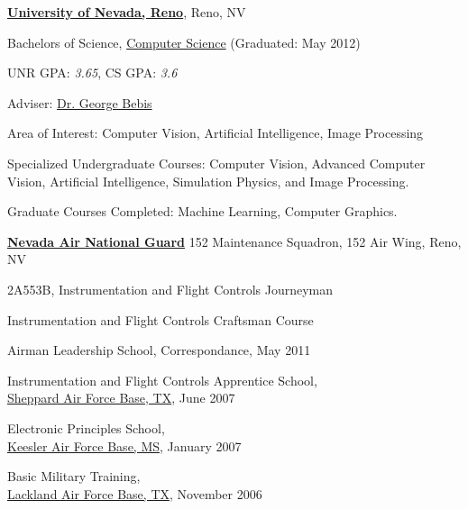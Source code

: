 \documentclass[10pt]{article}
\newenvironment{outerlist}[1][\enskip\textbullet]%
        {\begin{itemize}[#1]}{\end{itemize}%
         \vspace{-.6\baselineskip}}
\newenvironment{innerlist}[1][\enskip\textbullet]%
        {\begin{compactitem}[#1]}{\end{compactitem}}
\begin{document}
\href{http://www.unr.edu/}{\textbf{University of Nevada, Reno}},
Reno, NV 
\begin{outerlist}
\item[] Bachelors of Science, 
        \href{http://www.cse.unr.edu/}
             {Computer Science}
             (Graduated: May 2012)
        \begin{innerlist}
        \item UNR GPA: \emph{3.65}, CS GPA: \emph{3.6}
        \item Adviser:
              \href{http://www.cse.unr.edu/~bebis/}
                   {Dr. George Bebis}
        \item Area of Interest: Computer Vision, Artificial Intelligence, Image Processing
        \item Specialized Undergraduate Courses: Computer Vision, Advanced Computer Vision, 
              Artificial Intelligence, Simulation Physics, and Image Processing.
        \item Graduate Courses Completed: Machine Learning, Computer Graphics.\\
        \end{innerlist}
\end{outerlist}

\href{http://www.af.mil/}{\textbf{Nevada Air National Guard}}
152 Maintenance Squadron, 152 Air Wing, Reno, NV
\begin{outerlist}
\item[] 2A553B, {Instrumentation and Flight Controls Journeyman}
        \begin{innerlist}
        \item Instrumentation and Flight Controls Craftsman Course
        \item Airman Leadership School, Correspondance, May 2011
        \item Instrumentation and Flight Controls Apprentice School,\\
        \href{http://www.sheppard.af.mil/}
             {Sheppard Air Force Base, TX}, June 2007
        \item Electronic Principles School,\\
        \href{http://www.keesler.af.mil/}
             {Keesler Air Force Base, MS}, January 2007
        \item Basic Military Training,\\
        \href{http://www.lackland.af.mil/}
             {Lackland Air Force Base, TX}, November 2006\\
        \end{innerlist}
\end{outerlist}
\end{document}

